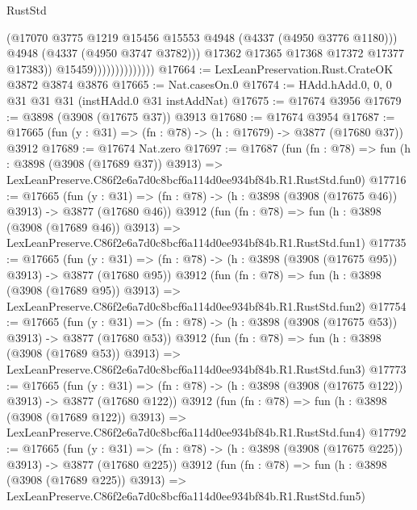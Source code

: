 \begin{lexlean}{RustStd}
\begin{coremodule}
                                      (@17070
                                        @3775
                                        @1219
                                        @15456
                                        @15553
                                        @4948
                                        (@4337 (@4950 @3776 @1180)))
                                      @4948
                                      (@4337 (@4950 @3747 @3782)))
                                    @17362
                                    @17365
                                    @17368
                                    @17372
                                    @17377
                                    @17383))
                                @15459))))))))))))))
@17664 := LexLeanPreservation.Rust.CrateOK @3872 @3874 @3876
@17665 := Nat.casesOn.{0}
@17674 := HAdd.hAdd.{0, 0, 0} @31 @31 @31 (instHAdd.{0} @31 instAddNat)
@17675 := @17674 @3956
@17679 := @3898 (@3908 (@17675 @37)) @3913
@17680 := @17674 @3954
@17687 := @17665 (fun (y : @31) => (fn : @78) -> (h : @17679) -> @3877 (@17680 @37)) @3912
@17689 := @17674 Nat.zero
@17697 := @17687
    (fun (fn : @78) =>
    fun (h : @3898 (@3908 (@17689 @37)) @3913) =>
    LexLeanPreserve.C86f2e6a7d0c8bcf6a114d0ee934bf84b.R1.RustStd.fun0)
@17716 := @17665
    (fun (y : @31) => (fn : @78) -> (h : @3898 (@3908 (@17675 @46)) @3913) -> @3877 (@17680 @46))
    @3912
    (fun (fn : @78) =>
    fun (h : @3898 (@3908 (@17689 @46)) @3913) =>
    LexLeanPreserve.C86f2e6a7d0c8bcf6a114d0ee934bf84b.R1.RustStd.fun1)
@17735 := @17665
    (fun (y : @31) => (fn : @78) -> (h : @3898 (@3908 (@17675 @95)) @3913) -> @3877 (@17680 @95))
    @3912
    (fun (fn : @78) =>
    fun (h : @3898 (@3908 (@17689 @95)) @3913) =>
    LexLeanPreserve.C86f2e6a7d0c8bcf6a114d0ee934bf84b.R1.RustStd.fun2)
@17754 := @17665
    (fun (y : @31) => (fn : @78) -> (h : @3898 (@3908 (@17675 @53)) @3913) -> @3877 (@17680 @53))
    @3912
    (fun (fn : @78) =>
    fun (h : @3898 (@3908 (@17689 @53)) @3913) =>
    LexLeanPreserve.C86f2e6a7d0c8bcf6a114d0ee934bf84b.R1.RustStd.fun3)
@17773 := @17665
    (fun (y : @31) => (fn : @78) -> (h : @3898 (@3908 (@17675 @122)) @3913) -> @3877 (@17680 @122))
    @3912
    (fun (fn : @78) =>
    fun (h : @3898 (@3908 (@17689 @122)) @3913) =>
    LexLeanPreserve.C86f2e6a7d0c8bcf6a114d0ee934bf84b.R1.RustStd.fun4)
@17792 := @17665
    (fun (y : @31) => (fn : @78) -> (h : @3898 (@3908 (@17675 @225)) @3913) -> @3877 (@17680 @225))
    @3912
    (fun (fn : @78) =>
    fun (h : @3898 (@3908 (@17689 @225)) @3913) =>
    LexLeanPreserve.C86f2e6a7d0c8bcf6a114d0ee934bf84b.R1.RustStd.fun5)

\end{coremodule}
\end{lexlean}
